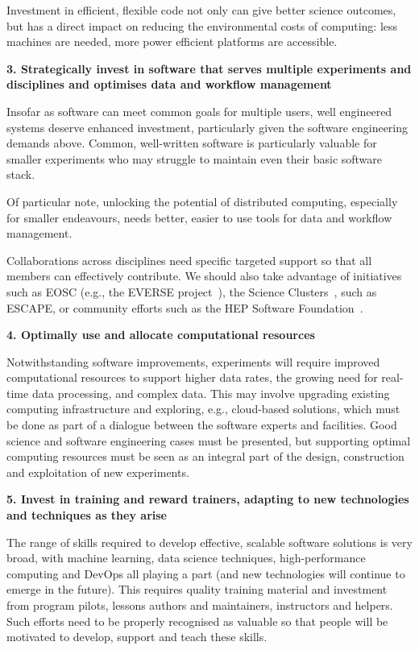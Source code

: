Investment in efficient, flexible code not only can give better science outcomes, but has a direct impact on reducing the environmental costs of computing: less machines are needed, more power efficient platforms are accessible.

{\bf 3. Strategically invest in software that serves multiple experiments and disciplines and optimises data and workflow management}

Insofar as software can meet common goals for multiple users, well engineered systems deserve enhanced investment, particularly given the software engineering demands above. Common, well-written software is particularly valuable for smaller experiments who may struggle to maintain even their basic software stack.

Of particular note, unlocking the potential of distributed computing, especially for smaller endeavours, needs better, easier to use tools for data and workflow management.

Collaborations across disciplines need specific targeted support so that all members can effectively contribute. We should also take advantage of initiatives such as EOSC (e.g., the EVERSE project~\cite{EVERSE}), the Science Clusters~\cite{ScienceClusters}, such as ESCAPE, or community efforts such as the HEP Software Foundation~\cite{HSF}.

{\bf 4. Optimally use and allocate computational resources}

Notwithstanding software improvements, experiments will require improved computational resources to support higher data rates, the growing need for real-time data processing, and complex data. This may involve upgrading existing computing infrastructure and exploring, e.g., cloud-based solutions, which must be done as part of a dialogue between the software experts and facilities. Good science and software engineering cases must be presented, but supporting optimal computing resources must be seen as an integral part of the design, construction and exploitation of new experiments.

{\bf 5. Invest in training and reward trainers, adapting to new technologies and techniques as they arise}

The range of skills required to develop effective, scalable software solutions is very broad, with machine learning, data science techniques, high-performance computing and DevOps all playing a part (and new technologies will continue to emerge in the future). This requires quality training material and investment from program pilots, lessons authors and maintainers, instructors and helpers. Such efforts need to be properly recognised as valuable so that people will be motivated to develop, support and teach these skills.

